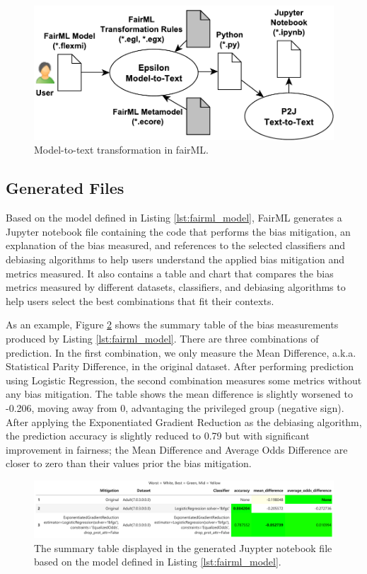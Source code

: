 \documentclass[sigconf,review]{acmart}
\begin{document}
{	\begin{figure}
		\includegraphics[width=\linewidth]{figures/transformation}
		\caption{Model-to-text transformation in fairML.}
		\label{fig:transformation}
	\end{figure}
	
	\subsection{Generated Files}
	\label{sec:generated_files}
	Based on the model defined in Listing \ref{lst:fairml_model}, FairML generates a Jupyter notebook file containing the code that performs the bias mitigation, an explanation of the bias measured, and references to the selected classifiers and debiasing algorithms to help users understand the applied bias mitigation and metrics measured. It also contains a table and chart that compares the bias metrics measured by different datasets, classifiers, and debiasing algorithms to help users select the best combinations that fit their contexts. 
	
	As an example, Figure \ref{fig:table-output} shows the summary table of the bias measurements produced by Listing \ref{lst:fairml_model}. There are three combinations of prediction. In the first combination, we only measure the Mean Difference, a.k.a. Statistical Parity Difference, in the original dataset. After performing prediction using Logistic Regression, the second combination measures some metrics without any bias mitigation. The table shows the mean difference is slightly worsened to -0.206, moving away from 0, advantaging the privileged group (negative sign). After applying the Exponentiated Gradient Reduction as the debiasing algorithm, the prediction accuracy is slightly reduced to 0.79 but with significant improvement in fairness; the Mean Difference and Average Odds Difference are closer to zero than their values prior the bias mitigation.
	
	
	\begin{figure}
		\includegraphics[width=\linewidth]{figures/table-output}
		\caption{The summary table displayed in the generated Juypter notebook file based on the model defined in Listing \ref{lst:fairml_model}.}
		\label{fig:table-output}
	\end{figure}
	
}
\end{document}
